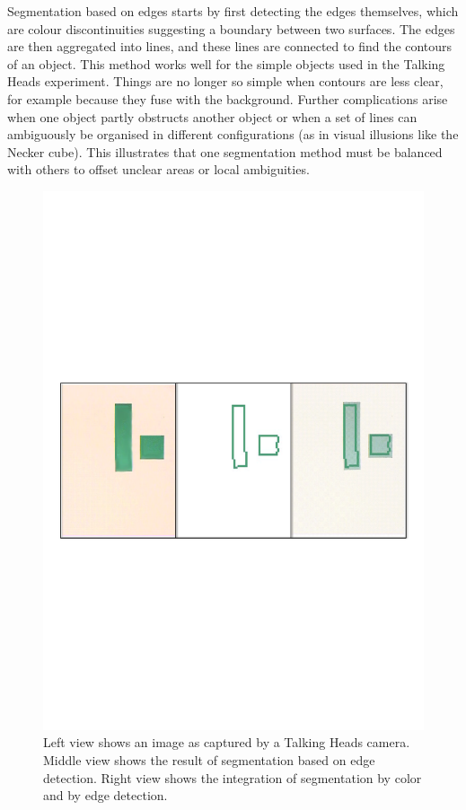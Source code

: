 Segmentation based on edges starts by first detecting the 
edges themselves, which are colour discontinuities suggesting a boundary
between two surfaces. The edges are then aggregated into lines, and these lines are 
connected to find the contours 
of an object. This method works well for the simple 
objects used in the Talking 
Heads experiment. Things are
no longer so simple when contours are less
clear, for example because they fuse with the background. 
Further complications arise when one object partly obstructs
another object or when a set of lines can ambiguously 
be organised in different configurations (as in visual illusions
like the Necker cube). This illustrates that one 
segmentation method must be balanced with others to offset unclear 
areas or local ambiguities. 

\begin{figure}[htbp]
  \centerline{\includegraphics[width=.75\textwidth]{chap3/figs/image1.pdf}}
\caption{Left view shows an image as captured by a Talking
Heads camera. Middle view shows the result of 
segmentation based on edge detection. Right view
shows the integration of segmentation by color
and by edge detection.}
\label{f:plate11}
\end{figure}

